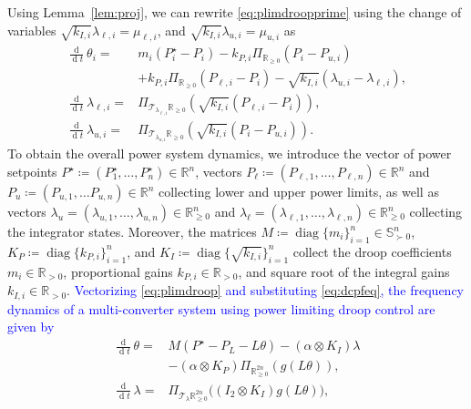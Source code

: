 \documentclass[twocolumn,twoside,journal]{IEEEtran}
\DeclareMathOperator{\diag}{diag}
\DeclareMathOperator{\diff}{d}
\newcommand{\ddt}{\tfrac{\diff}{\diff \!t}}
\begin{document}
Using Lemma~\ref{lem:proj}, we can rewrite \eqref{eq:plimdroopprime} using the change of variables $\sqrt{k_{I,i}} \lambda_{\ell,i} = \mu_{\ell,i}$, and $\sqrt{k_{I,i}} \lambda_{u,i} = \mu_{u,i}$ as
\begin{subequations}\label{eq:plimdroop}
    \begin{align}
    \!\!\!\!\!\!\!\!\!\ddt \theta_i =& m_i (P^\star_i-P_i)\! -\! k_{P,i} \Pi_{{\mathbb{R}}_{\geq 0}}(P_i-P_{u,i}) \label{eq:plimdroop:angle}\\ &+ k_{P,i} \Pi_{{\mathbb{R}}_{\geq 0} }(P_{\ell,i} - P_i) - \sqrt{k_{I,i}} (\lambda_{u,i}-\lambda_{\ell,i}), \nonumber\\
    \!\!\!\!\!\!\!\!\!\ddt\lambda_{\ell,i} =&  \Pi_{\mathcal{T}_{\lambda_{\ell,i}} \mathbb{R}_{\geq 0}} \left(\sqrt{k_{I,i}}(P_{\ell,i} - P_i)\right),\\
    \!\!\!\!\!\!\!\!\!\ddt\lambda_{u,i} =&  \Pi_{\mathcal{T}_{\lambda_{u,i}} \mathbb{R}_{\geq 0}} \left(\sqrt{k_{I,i}}(P_i - P_{u,i})\right).
    \end{align}
\end{subequations}
%
To obtain the overall power system dynamics, we introduce the vector of power setpoints $P^\star \coloneqq \left(P^\star_1, \ldots, P^\star_{n}\right) \in \mathbb{R}^n$,  vectors $P_{\ell} \coloneqq \left(P_{\ell, 1}, \ldots, P_{\ell, n}\right) \in \mathbb{R}^n$ and $P_{u} \coloneqq \left(P_{u, 1}, \ldots P_{u, n}\right) \in \mathbb{R}^n$ collecting lower and upper power limits, as well as vectors $\lambda_u=(\lambda_{u,1},\ldots,\lambda_{u,n}) \in \mathbb{R}^n_{\geq 0}$ and $\lambda_\ell=(\lambda_{\ell,1},\ldots,\lambda_{\ell,n}) \in \mathbb{R}^n_{\geq 0}$ collecting the integrator states. Moreover, the matrices $M \coloneqq \diag\{m_i\}_{i=1}^n \in \mathbb{S}_{\succ 0}^n$, $K_P \coloneqq \diag\{k_{P, i}\}_{i=1}^{n}$, and $K_{I} \coloneqq \diag \{\sqrt{k_{I, i}}\}_{i=1}^{n}$ collect the droop coefficients $m_i \in \mathbb{R}_{>0}$, proportional gains $k_{P, i} \in \mathbb{R}_{>0}$, and square root of the integral gains $k_{I, i} \in \mathbb{R}_{>0}$. \textcolor{blue}{Vectorizing \eqref{eq:plimdroop} and substituting \eqref{eq:dcpfeq}, the frequency dynamics of a multi-converter system using power limiting droop control are given by}
%
\begin{subequations}\label{eq:plimdroop}
    \begin{align}
        \ddt\theta =& M\left(P^\star-P_L-L \theta\right) - \left(\alpha \otimes K_I \right)\lambda \label{eq:plimdroop:theta}\\ 
            &-\left( \alpha \otimes K_P \right) \Pi_{{\mathbb{R}}^{2n}_{\geq 0} }\left(g(L \theta)\right), \nonumber \\
            \ddt\lambda =&  \Pi_{\mathcal{T}_{\lambda} \mathbb{R}^{2n}_{\geq 0}} \big(\left(I_2 \otimes K_{I}\right) g(L\theta)\big), \label{eq:plimdroop:lambda}
    \end{align}
\end{subequations}
\end{document}
